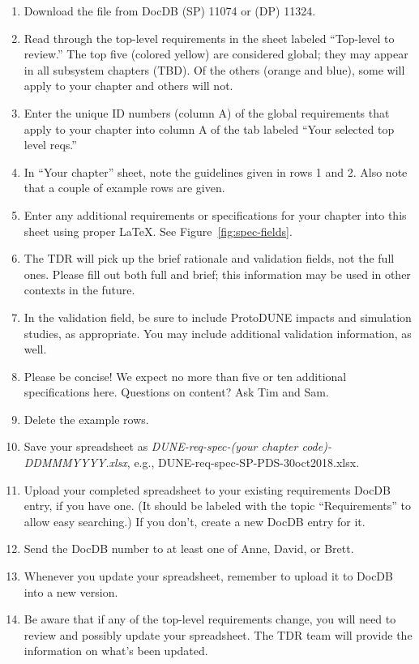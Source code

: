 \begin{enumerate}
\item Download the file from DocDB  (SP) 11074 or (DP) 11324. 
\item Read through the top-level requirements in the sheet labeled ``Top-level to review.''  The top five (colored yellow) are considered global; they may appear in all subsystem chapters (TBD). Of the others (orange and blue), some will apply to your chapter and others will not.
\item Enter the unique ID numbers (column A) of the global requirements that apply to your chapter into column A of the tab labeled ``Your selected top level reqs.''
\item In ``Your chapter'' sheet, note the guidelines given in rows 1 and 2. Also note that a couple of example rows are given.
\item  Enter any additional requirements or specifications for your chapter into this sheet using proper LaTeX.  See Figure~\ref{fig:spec-fields}.
\item The TDR will pick up the brief rationale and validation fields, not the full ones. Please fill out both full and brief; this information may be used in other contexts in the future.
\item In the validation field, be sure to include ProtoDUNE impacts and simulation studies, as appropriate. You may include additional validation information, as well.  
\item Please be concise!  We expect no more than five or ten additional specifications here. Questions on content? Ask Tim and Sam.
\item Delete the example rows.
\item Save your spreadsheet as \textit{DUNE-req-spec-(your chapter code)-DDMMMYYYY.xlsx}, e.g., DUNE-req-spec-SP-PDS-30oct2018.xlsx.
\item Upload your completed spreadsheet to your existing requirements DocDB entry, if you have one. (It should be labeled with the topic ``Requirements'' to allow easy searching.) If you don't, create a new DocDB entry for it. 
\item Send the DocDB number to at least one of Anne, David, or Brett.
\item Whenever you update your spreadsheet, remember to upload it to DocDB into a new version. 
\item Be aware that if any of the top-level requirements change, you will need to review and possibly update your spreadsheet.  The TDR team will provide the information on what's been updated.
\end{enumerate}

